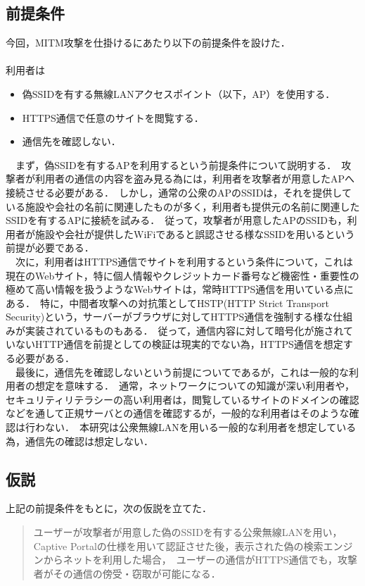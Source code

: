 \documentclass[dvipdfmx]{jsarticle}
\begin{document}
        \subsection{前提条件}
            今回，MITM攻撃を仕掛けるにあたり以下の前提条件を設けた．\\
            \\
            利用者は
            \begin{itemize}
                \item 偽SSIDを有する無線LANアクセスポイント（以下，AP）を使用する．
                \item HTTPS通信で任意のサイトを閲覧する．
                \item 通信先を確認しない．
            \end{itemize}
            　まず，偽SSIDを有するAPを利用するという前提条件について説明する．\
            攻撃者が利用者の通信の内容を盗み見る為には，利用者を攻撃者が用意したAPへ接続させる必要がある．\
            しかし，通常の公衆のAPのSSIDは，それを提供している施設や会社の名前に関連したものが多く，利用者も提供元の名前に関連したSSIDを有するAPに接続を試みる．\
            従って，攻撃者が用意したAPのSSIDも，利用者が施設や会社が提供したWiFiであると誤認させる様なSSIDを用いるという前提が必要である．\\
            　次に，利用者はHTTPS通信でサイトを利用するという条件について，これは現在のWebサイト，特に個人情報やクレジットカード番号など機密性・重要性の極めて高い情報を扱うようなWebサイトは，常時HTTPS通信を用いている点にある．\
            特に，中間者攻撃への対抗策としてHSTP(HTTP Strict Transport Security)という，サーバーがブラウザに対してHTTPS通信を強制する様な仕組みが実装されているものもある．\
            従って，通信内容に対して暗号化が施されていないHTTP通信を前提としての検証は現実的でない為，HTTPS通信を想定する必要がある．\\
            　最後に，通信先を確認しないという前提についてであるが，これは一般的な利用者の想定を意味する．\
            通常，ネットワークについての知識が深い利用者や，セキュリティリテラシーの高い利用者は，閲覧しているサイトのドメインの確認などを通して正規サーバとの通信を確認するが，一般的な利用者はそのような確認は行わない．\
            本研究は公衆無線LANを用いる一般的な利用者を想定している為，通信先の確認は想定しない．\\
        \subsection{仮説}
            上記の前提条件をもとに，次の仮説を立てた．
            \begin{quote}
                ユーザーが攻撃者が用意した偽のSSIDを有する公衆無線LANを用い，Captive Portalの仕様を用いて認証させた後，表示された偽の検索エンジンからネットを利用した場合，\
                ユーザーの通信がHTTPS通信でも，攻撃者がその通信の傍受・窃取が可能になる．
            \end{quote}
\end{document}
